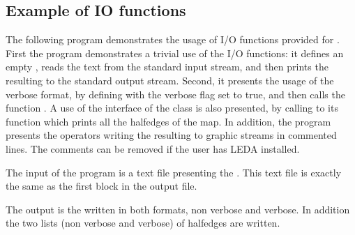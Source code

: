 \subsection{Example of IO functions}
\label{PM_sec:example9}

The following program demonstrates the usage of I/O functions provided for .
First the program demonstrates a trivial use of the I/O functions: it defines an empty , 
reads the  text from the standard input stream, and then prints  the resulting  
to the standard output stream.
Second, it presents the usage of the verbose format, by defining  with the verbose flag set to true, 
and then calls the function .
A use of the interface of the class  is also presented, by calling to its function 
 which prints all the halfedges of the map.
In addition, the program presents the operators writing the resulting  to graphic streams  in commented lines.
The comments can be removed if the user has LEDA installed. 


The input of the program is a text file presenting the . This text file is exactly the same as the first block in the 
output file.
 

The output is the  written in both formats, non verbose and verbose. In addition the two lists 
(non verbose and verbose) of halfedges are written.















